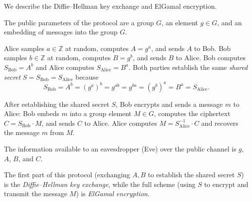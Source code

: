 
We describe the Diffie--Hellman key exchange and ElGamal encryption.

\begin{definition}
    The public parameters of the protocol are a group \(G\), an element \(g \in G\), and an embedding of messages into the group \(G\).

    Alice samples \(a \in \mathbb{Z}\) at random, computes \(A = g^a\), and sends \(A\) to Bob.
    Bob samples \(b \in \mathbb{Z}\) at random, computes \(B = g^b\), and sends \(B\) to Alice.
    Bob computes \(S_{\text{Bob}} = A^b\) and Alice computes \(S_{\text{Alice}} = B^a\).
    Both parties establish the same \emph{shared secret} \(S = S_{\text{Bob}} = S_{\text{Alice}}\) because
    \[
        S_{\text{Bob}} = A^b = (g^a)^b = g^{ab} = g^{ba} = (g^b)^a = B^a = S_{\text{Alice}}.
    \]

    After establishing the shared secret \(S\), Bob encrypts and sends a message \(m\) to Alice:
    Bob embeds \(m\) into a group element \(M \in G\), computes the ciphertext \(C = S_{\text{Bob}} \cdot M\), and sends \(C\) to Alice.
    Alice computes \(M = S_{\text{Alice}}^{-1} \cdot C\) and recovers the message \(m\) from \(M\).
\end{definition}

The information available to an eavesdropper (Eve) over the public channel is \(g\), \(A\), \(B\), and \(C\).

The first part of this protocol (exchanging \(A, B\) to establish the shared secret \(S\)) is the \emph{Diffie--Hellman key exchange}, while the full scheme (using \(S\) to encrypt and transmit the message \(M\)) is \emph{ElGamal encryption}.

